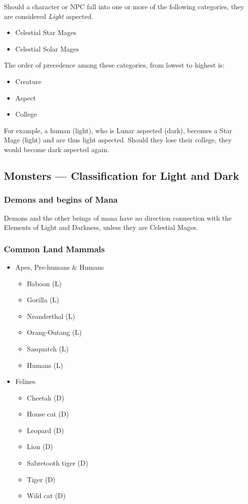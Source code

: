 \begin{multicols}{3}
Should a character or NPC fall into one or more of the following
categories, they are considered \emph{Light} aspected.
\begin{itemize}
\item Celestial Star Mages
\item Celestial Solar Mages
\end{itemize}

The order of precedence among these categories, from lowest to highest
is:
\begin{itemize}
\item Creature
\item Aspect
\item College
\end{itemize}

For example, a human (light), who is Lunar aspected (dark), becomes a
Star Mage (light) and are thus light aspected.  Should they lose their
college, they would become dark aspected again.

\subsection{Monsters --- Classification for Light and Dark}

\subsubsection{Demons and begins of Mana}

Demons and the other beings of mana have no direction connection with
the Elements of Light and Darkness, unless they are Celestial Mages.

\subsubsection{Common Land Mammals}
\begin{itemize}

\item Apes, Pre-humans \& Humans
\begin{itemize}
\item Baboon (L)
\item Gorilla (L)
\item Neanderthal (L)
\item Orang-Outang (L)
\item Sasquatch (L)
\item Humans (L)
\end{itemize}

\item Felines
\begin{itemize}
\item Cheetah (D)
\item House cat (D)
\item Leopard (D)
\item Lion (D)
\item Sabretooth tiger (D)
\item Tiger (D)
\item Wild cat (D)
\end{itemize}


\end{itemize}
\end{multicols}
